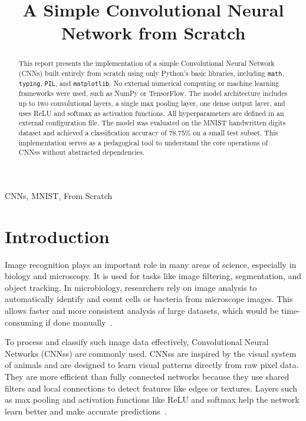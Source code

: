 \documentclass[conference]{IEEEtran}
\title{A Simple Convolutional Neural Network from Scratch}
\author{
\IEEEauthorblockN{Nguyen Nhat Anh - 2440057}
\IEEEauthorblockA{University of Science and Technology of Hanoi (USTH)\\
anhnn2440057@usth.edu.vn}
}
\begin{document}
\maketitle

\renewcommand{\thesubsection}{\alph{subsection}}

\makeatletter
\renewcommand{\@seccntformat}[1]{
  \ifcsname the#1\endcsname
    \csname the#1\endcsname.\hspace{0.5em}
  \else
    \csname name#1\endcsname:\hspace{0.5em}
  \fi}
\makeatother
\begin{abstract}
This report presents the implementation of a simple Convolutional Neural Network (CNNs) built entirely from scratch using only Python’s basic libraries, including \texttt{math}, \texttt{typing}, \texttt{PIL}, and \texttt{matplotlib}. No external numerical computing or machine learning frameworks were used, such as NumPy or TensorFlow. The model architecture includes up to two convolutional layers, a single max pooling layer, one dense output layer, and uses ReLU and softmax as activation functions. All hyperparameters are defined in an external configuration file. The model was evaluated on the MNIST handwritten digits dataset and achieved a classification accuracy of 78.75\%  on a small test subset. This implementation serves as a pedagogical tool to understand the core operations of CNNss without abstracted dependencies.
\end{abstract}

\begin{IEEEkeywords}
CNNs, MNIST, From Scratch
\end{IEEEkeywords}

\section{Introduction}

Image recognition plays an important role in many areas of science, especially in biology and microscopy. It is used for tasks like image filtering, segmentation, and object tracking. In microbiology, researchers rely on image analysis to automatically identify and count cells or bacteria from microscope images. This allows faster and more consistent analysis of large datasets, which would be time-consuming if done manually~\cite{shamir2010microscopy,uchida2018biology}.

To process and classify such image data effectively, Convolutional Neural Networks (CNNss) are commonly used. CNNss are inspired by the visual system of animals and are designed to learn visual patterns directly from raw pixel data. They are more efficient than fully connected networks because they use shared filters and local connections to detect features like edges or textures. Layers such as max pooling and activation functions like ReLU and softmax help the network learn better and make accurate predictions~\cite{matsugu2003face,aghdam2017CNNs}.
\end{document}
